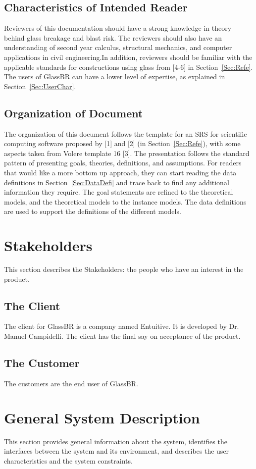 \documentclass[12pt]{article}
\begin{document}
\subsection{Characteristics of Intended Reader}
\label{Sec:CharofInteRead}
Reviewers of this documentation should have a strong knowledge in theory behind glass breakage and blast risk. The reviewers should also have an understanding of second year calculus, structural mechanics, and computer applications in civil engineering.In addition, reviewers should be familiar with the applicable standards for constructions using glass from [4-6] in Section~\ref{Sec:Refe}. The users of GlassBR can have a lower level of expertise, as explained in Section~\ref{Sec:UserChar}.
\subsection{Organization of Document}
\label{Sec:OrgaofDocu}
The organization of this document follows the template for an SRS for scientific computing software proposed by [1] and [2] (in Section~\ref{Sec:Refe}), with some aspects taken from Volere template 16 [3]. The presentation follows the standard pattern of presenting goals, theories, definitions, and assumptions. For readers that would like a more bottom up approach, they can start reading the data definitions in Section~\ref{Sec:DataDefi} and trace back to find any additional information they require.
The goal statements are refined to the theoretical models, and the theoretical models to the instance models. The data definitions are used to support the definitions of the different models.
\section{Stakeholders}
\label{Sec:Stak}
This section describes the Stakeholders: the people who have an interest in the product.
\subsection{The Client}
\label{Sec:TheClie}
The client for GlassBR is a company named Entuitive. It is developed by Dr. Manuel Campidelli. The client has the final say on acceptance of the product.
\subsection{The Customer}
\label{Sec:TheCust}
The customers are the end user of GlassBR.
\section{General System Description}
\label{Sec:GeneSystDesc}
This section provides general information about the system, identifies the interfaces between the system and its environment, and describes the user characteristics and the system constraints.
\end{document}

